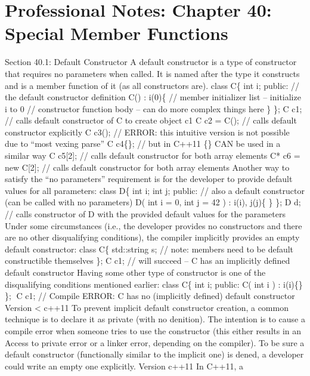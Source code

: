 \hypertarget{professional-notes-chapter-40-special-member-functions-1}{%
\chapter{Professional Notes: Chapter 40: Special Member
Functions}\label{professional-notes-chapter-40-special-member-functions-1}}

Section 40.1: Default Constructor A default constructor is a type of
constructor that requires no parameters when called. It is named after
the type it constructs and is a member function of it (as all
constructors are). class C\{ int i; public: // the default constructor
definition C() : i(0)\{ // member initializer list -- initialize i to 0
// constructor function body -- can do more complex things here \} \}; C
c1; // calls default constructor of C to create object c1 C c2 = C(); //
calls default constructor explicitly C c3(); // ERROR: this intuitive
version is not possible due to ``most vexing parse'' C c4\{\}; // but in
C++11 \{\} CAN be used in a similar way C c5{[}2{]}; // calls default
constructor for both array elements C* c6 = new C{[}2{]}; // calls
default constructor for both array elements Another way to satisfy the
``no parameters'' requirement is for the developer to provide default
values for all parameters: class D\{ int i; int j; public: // also a
default constructor (can be called with no parameters) D( int i = 0, int
j = 42 ) : i(i), j(j)\{ \} \}; D d; // calls constructor of D with the
provided default values for the parameters Under some circumstances
(i.e., the developer provides no constructors and there are no other
disqualifying conditions), the compiler implicitly provides an empty
default constructor: class C\{ std::string s; // note: members need to
be default constructible themselves \}; C c1; // will succeed -- C has
an implicitly defined default constructor Having some other type of
constructor is one of the disqualifying conditions mentioned earlier:
class C\{ int i; public: C( int i ) : i(i)\{\} \}; C c1; // Compile
ERROR: C has no (implicitly defined) default constructor Version
\textless{} c++11 To prevent implicit default constructor creation, a
common technique is to declare it as private (with no denition). The
intention is to cause a compile error when someone tries to use the
constructor (this either results in an Access to private error or a
linker error, depending on the compiler). To be sure a default
constructor (functionally similar to the implicit one) is dened, a
developer could write an empty one explicitly. Version c++11 In C++11, a
